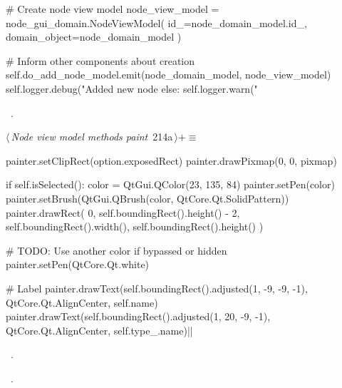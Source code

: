 \documentclass[%
    a4paper,    %
    justified,  %
    nobib,      %
    openany     %
]{tufte-book}
\makeatletter
\renewcommand{\label}[1]{\@tufte@label{##1}}%
\makeatother
\begin{document}
\begin{fullwidth}
\begin{flushleft}
\begin{minipage}{\linewidth}
\begin{pythoncode}
        # Create node view model
        node_view_model = node_gui_domain.NodeViewModel(
            id_=node_domain_model.id_,
            domain_object=node_domain_model
        )

        # Inform other components about creation
        self.do_add_node_model.emit(node_domain_model, node_view_model)
        self.logger.debug("Added new node %
    else:
        self.logger.warn("%
\end{pythoncode}
\vspace{1.5ex}
\footnotesize
\begin{list}{}{\setlength{\itemsep}{-\parsep}\setlength{\itemindent}{-\leftmargin}}
\item \NWtxtMacroRefIn\ .

\item{}
\end{list}
\end{minipage}\vspace{4ex}
\end{flushleft}
\begin{flushleft} \small
\begin{minipage}{\linewidth}\label{scrap216}\raggedright\small
{} $\langle\,${\itshape Node view model methods paint}\nobreak\ {\footnotesize {214a}}$\,\rangle+\equiv$
\vspace{-1ex}
\begin{pythoncode}
painter.setClipRect(option.exposedRect)
painter.drawPixmap(0, 0, pixmap)

if self.isSelected():
    color = QtGui.QColor(23, 135, 84)
    painter.setPen(color)
    painter.setBrush(QtGui.QBrush(color, QtCore.Qt.SolidPattern))
    painter.drawRect(
        0,
        self.boundingRect().height() - 2,
        self.boundingRect().width(),
        self.boundingRect().height()
    )

# TODO: Use another color if bypassed or hidden
painter.setPen(QtCore.Qt.white)

# Label
painter.drawText(self.boundingRect().adjusted(1, -9, -9, -1), QtCore.Qt.AlignCenter, self.name)
painter.drawText(self.boundingRect().adjusted(1, 20, -9, -1), QtCore.Qt.AlignCenter, self.type_.name)|\NWsep|
\end{pythoncode}
\vspace{1.5ex}
\footnotesize
\begin{list}{}{\setlength{\itemsep}{-\parsep}\setlength{\itemindent}{-\leftmargin}}
\item \NWtxtMacroDefBy\ .
\item \NWtxtMacroRefIn\ .


\end{list}
\end{minipage}
\end{flushleft}
\end{fullwidth}
\end{document}
